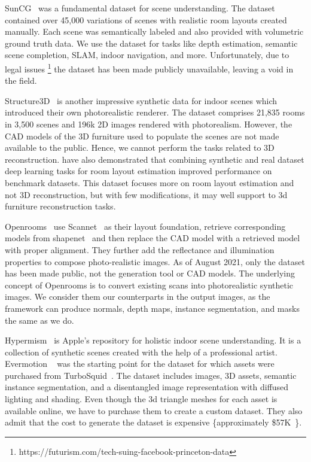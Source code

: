 SunCG~\cite{Song2017SemanticSC} was a fundamental dataset for scene understanding.
The dataset contained over 45,000 variations of scenes with realistic room layouts created manually.
Each scene was semantically labeled and also provided with volumetric ground truth data.
We use the dataset for tasks like depth estimation, semantic scene completion, SLAM, indoor navigation, and more.
Unfortunately, due to legal issues \footnote{https://futurism.com/tech-suing-facebook-princeton-data} the dataset has been made publicly unavailable, leaving a void in the field.

Structure3D~\cite{zheng2020structured3d} is another impressive synthetic data for indoor scenes which introduced their own photorealistic renderer.
The dataset comprises 21,835 rooms in 3,500 scenes and 196k 2D images rendered with photorealism.
However, the CAD models of the 3D furniture used to populate the scenes are not made available to the public.
Hence, we cannot perform the tasks related to  3D reconstruction.
\cite{zheng2020structured3d} have also demonstrated that combining synthetic and real dataset deep learning tasks for room layout estimation improved performance on benchmark datasets.
This dataset focuses more on room layout estimation and not 3D reconstruction, but with few modifications, it may well support to 3d furniture reconstruction tasks.

Openrooms~\cite{li2021openrooms} use Scannet~\cite{dai2017scannet} as their layout foundation, retrieve corresponding models from shapenet~\cite{chang2015shapenet}
and then replace the CAD model with a retrieved model with proper alignment.
They further add the reflectance and illumination properties to compose photo-realistic images.
As of August 2021, only the dataset has been made public, not the generation tool or CAD models.
The underlying concept of Openrooms is to convert existing scans into photorealistic synthetic images.
We consider them our counterparts in the output images, as the framework can produce normals, depth maps, instance segmentation, and masks the same as we do.

Hypermism~\cite{Roberts2020HypersimAP} is Apple's repository for holistic indoor scene understanding.
It is a collection of synthetic scenes created with the help of a professional artist.
Evermotion ~\cite{Evermotion} was the starting point for the dataset for which assets were purchased from TurboSquid~\cite{TurboSquid}.
The dataset includes images, 3D assets, semantic instance segmentation, and a disentangled image representation with diffused lighting and shading.
Even though the 3d triangle meshes for each asset is available online, we have to purchase them to create a custom dataset.
They also admit that the cost to generate the dataset is expensive \{approximately \$57K~\cite{Roberts2020HypersimAP}\}.

